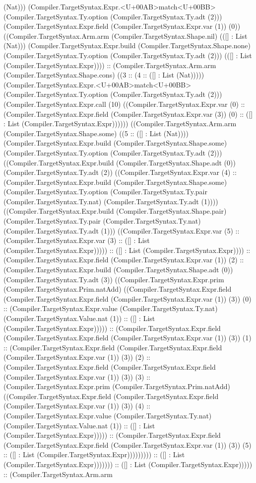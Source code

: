 \documentclass[11pt]{article}
\begin{document}
(Nat))) (Compiler.TargetSyntax.Expr.<U+00AB>match<U+00BB> (Compiler.TargetSyntax.Ty.option (Compiler.TargetSyntax.Ty.adt (2))) (Compiler.TargetSyntax.Expr.field (Compiler.TargetSyntax.Expr.var (1)) (0)) ((Compiler.TargetSyntax.Arm.arm (Compiler.TargetSyntax.Shape.nil) (([] : List (Nat))) (Compiler.TargetSyntax.Expr.build (Compiler.TargetSyntax.Shape.none) (Compiler.TargetSyntax.Ty.option (Compiler.TargetSyntax.Ty.adt (2))) (([] : List (Compiler.TargetSyntax.Expr)))) :: (Compiler.TargetSyntax.Arm.arm (Compiler.TargetSyntax.Shape.cons) ((3 :: (4 :: ([] : List (Nat))))) (Compiler.TargetSyntax.Expr.<U+00AB>match<U+00BB> (Compiler.TargetSyntax.Ty.option (Compiler.TargetSyntax.Ty.adt (2))) (Compiler.TargetSyntax.Expr.call (10) ((Compiler.TargetSyntax.Expr.var (0) :: (Compiler.TargetSyntax.Expr.field (Compiler.TargetSyntax.Expr.var (3)) (0) :: ([] : List (Compiler.TargetSyntax.Expr)))))) ((Compiler.TargetSyntax.Arm.arm (Compiler.TargetSyntax.Shape.some) ((5 :: ([] : List (Nat)))) (Compiler.TargetSyntax.Expr.build (Compiler.TargetSyntax.Shape.some) (Compiler.TargetSyntax.Ty.option (Compiler.TargetSyntax.Ty.adt (2))) ((Compiler.TargetSyntax.Expr.build (Compiler.TargetSyntax.Shape.adt (0)) (Compiler.TargetSyntax.Ty.adt (2)) ((Compiler.TargetSyntax.Expr.var (4) :: (Compiler.TargetSyntax.Expr.build (Compiler.TargetSyntax.Shape.some) (Compiler.TargetSyntax.Ty.option (Compiler.TargetSyntax.Ty.pair (Compiler.TargetSyntax.Ty.nat) (Compiler.TargetSyntax.Ty.adt (1)))) ((Compiler.TargetSyntax.Expr.build (Compiler.TargetSyntax.Shape.pair) (Compiler.TargetSyntax.Ty.pair (Compiler.TargetSyntax.Ty.nat) (Compiler.TargetSyntax.Ty.adt (1))) ((Compiler.TargetSyntax.Expr.var (5) :: (Compiler.TargetSyntax.Expr.var (3) :: ([] : List (Compiler.TargetSyntax.Expr))))) :: ([] : List (Compiler.TargetSyntax.Expr)))) :: (Compiler.TargetSyntax.Expr.field (Compiler.TargetSyntax.Expr.var (1)) (2) :: (Compiler.TargetSyntax.Expr.build (Compiler.TargetSyntax.Shape.adt (0)) (Compiler.TargetSyntax.Ty.adt (3)) ((Compiler.TargetSyntax.Expr.prim (Compiler.TargetSyntax.Prim.natAdd) ((Compiler.TargetSyntax.Expr.field (Compiler.TargetSyntax.Expr.field (Compiler.TargetSyntax.Expr.var (1)) (3)) (0) :: (Compiler.TargetSyntax.Expr.value (Compiler.TargetSyntax.Ty.nat) (Compiler.TargetSyntax.Value.nat (1)) :: ([] : List (Compiler.TargetSyntax.Expr))))) :: (Compiler.TargetSyntax.Expr.field (Compiler.TargetSyntax.Expr.field (Compiler.TargetSyntax.Expr.var (1)) (3)) (1) :: (Compiler.TargetSyntax.Expr.field (Compiler.TargetSyntax.Expr.field (Compiler.TargetSyntax.Expr.var (1)) (3)) (2) :: (Compiler.TargetSyntax.Expr.field (Compiler.TargetSyntax.Expr.field (Compiler.TargetSyntax.Expr.var (1)) (3)) (3) :: (Compiler.TargetSyntax.Expr.prim (Compiler.TargetSyntax.Prim.natAdd) ((Compiler.TargetSyntax.Expr.field (Compiler.TargetSyntax.Expr.field (Compiler.TargetSyntax.Expr.var (1)) (3)) (4) :: (Compiler.TargetSyntax.Expr.value (Compiler.TargetSyntax.Ty.nat) (Compiler.TargetSyntax.Value.nat (1)) :: ([] : List (Compiler.TargetSyntax.Expr))))) :: (Compiler.TargetSyntax.Expr.field (Compiler.TargetSyntax.Expr.field (Compiler.TargetSyntax.Expr.var (1)) (3)) (5) :: ([] : List (Compiler.TargetSyntax.Expr))))))))) :: ([] : List (Compiler.TargetSyntax.Expr))))))) :: ([] : List (Compiler.TargetSyntax.Expr))))) :: (Compiler.TargetSyntax.Arm.arm 
\end{document}
